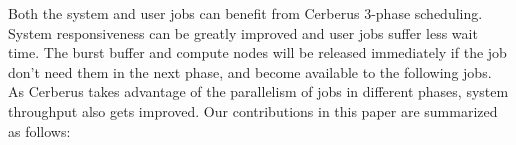 Both the system and user jobs can benefit from Cerberus 3-phase scheduling.
System responsiveness can be greatly improved and
user jobs suffer less wait time. 
The burst buffer and compute nodes will be released immediately
if the job don't need them in the next phase,
and become available to the following jobs.
As Cerberus takes advantage of the parallelism of jobs in different phases,
system throughput also gets improved.
Our contributions in this paper are summarized as follows:
